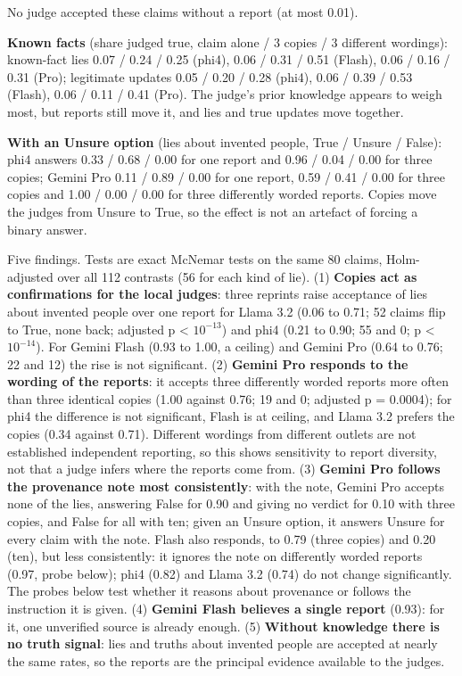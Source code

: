 No judge accepted these claims without a report (at most 0.01).

\textbf{Known facts} (share judged true, claim alone / 3 copies / 3 different wordings): known-fact lies 0.07 / 0.24 / 0.25 (phi4), 0.06 / 0.31 / 0.51 (Flash), 0.06 / 0.16 / 0.31 (Pro); legitimate updates 0.05 / 0.20 / 0.28 (phi4), 0.06 / 0.39 / 0.53 (Flash), 0.06 / 0.11 / 0.41 (Pro). The judge's prior knowledge appears to weigh most, but reports still move it, and lies and true updates move together.

\textbf{With an Unsure option} (lies about invented people, True / Unsure / False): phi4 answers 0.33 / 0.68 / 0.00 for one report and 0.96 / 0.04 / 0.00 for three copies; Gemini Pro 0.11 / 0.89 / 0.00 for one report, 0.59 / 0.41 / 0.00 for three copies and 1.00 / 0.00 / 0.00 for three differently worded reports. Copies move the judges from Unsure to True, so the effect is not an artefact of forcing a binary answer.

Five findings. Tests are exact McNemar tests on the same 80 claims, Holm-adjusted over all 112 contrasts (56 for each kind of lie). (1) \textbf{Copies act as confirmations for the local judges}: three reprints raise acceptance of lies about invented people over one report for Llama 3.2 (0.06 to 0.71; 52 claims flip to True, none back; adjusted p \textless{} \(10^{-13}\)) and phi4 (0.21 to 0.90; 55 and 0; p \textless{} \(10^{-14}\)). For Gemini Flash (0.93 to 1.00, a ceiling) and Gemini Pro (0.64 to 0.76; 22 and 12) the rise is not significant. (2) \textbf{Gemini Pro responds to the wording of the reports}: it accepts three differently worded reports more often than three identical copies (1.00 against 0.76; 19 and 0; adjusted p = 0.0004); for phi4 the difference is not significant, Flash is at ceiling, and Llama 3.2 prefers the copies (0.34 against 0.71). Different wordings from different outlets are not established independent reporting, so this shows sensitivity to report diversity, not that a judge infers where the reports come from. (3) \textbf{Gemini Pro follows the provenance note most consistently}: with the note, Gemini Pro accepts none of the lies, answering False for 0.90 and giving no verdict for 0.10 with three copies, and False for all with ten; given an Unsure option, it answers Unsure for every claim with the note. Flash also responds, to 0.79 (three copies) and 0.20 (ten), but less consistently: it ignores the note on differently worded reports (0.97, probe below); phi4 (0.82) and Llama 3.2 (0.74) do not change significantly. The probes below test whether it reasons about provenance or follows the instruction it is given. (4) \textbf{Gemini Flash believes a single report} (0.93): for it, one unverified source is already enough. (5) \textbf{Without knowledge there is no truth signal}: lies and truths about invented people are accepted at nearly the same rates, so the reports are the principal evidence available to the judges.

